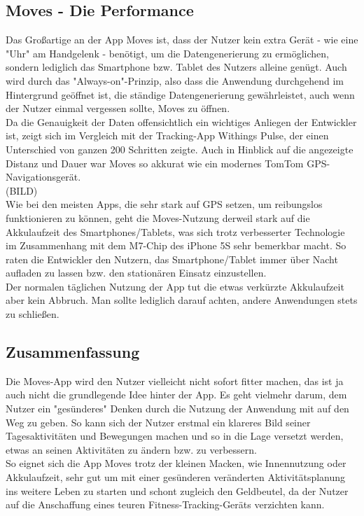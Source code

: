 \subsection{Moves - Die Performance}
\label{ch:Apps:sec:Moves:subsec:PERF}

Das Großartige an der App Moves ist, dass der Nutzer kein extra Gerät - wie eine "Uhr" am Handgelenk - benötigt, um die Datengenerierung zu ermöglichen, sondern lediglich das Smartphone bzw. Tablet des Nutzers alleine genügt. 
Auch wird durch das "Always-on"-Prinzip, also dass die Anwendung durchgehend im Hintergrund geöffnet ist, die ständige Datengenerierung gewährleistet, auch wenn der Nutzer einmal vergessen sollte, Moves zu öffnen.
\\
Da die Genauigkeit der Daten offensichtlich ein wichtiges Anliegen der Entwickler ist, zeigt sich im Vergleich mit der Tracking-App Withings Pulse, der einen Unterschied von ganzen 200 Schritten zeigte. 
Auch in Hinblick auf die angezeigte Distanz und Dauer war Moves so akkurat wie ein modernes TomTom GPS-Navigationsgerät.
\\
(BILD)
\\
Wie bei den meisten Apps, die sehr stark auf GPS setzen, um reibungslos funktionieren zu können, geht die Moves-Nutzung derweil stark auf die Akkulaufzeit des Smartphones/Tablets, was sich trotz verbesserter Technologie im Zusammenhang mit dem M7-Chip des iPhone 5S sehr bemerkbar macht. 
So raten die Entwickler den Nutzern, das Smartphone/Tablet immer über Nacht aufladen zu lassen bzw. den stationären Einsatz einzustellen.
\\
Der normalen täglichen Nutzung der App tut die etwas verkürzte Akkulaufzeit aber kein Abbruch. 
Man sollte lediglich darauf achten, andere Anwendungen stets zu schließen.

\subsection{Zusammenfassung}
\label{ch:Apps:sec:Moves:subsec:VERDICT} 

Die Moves-App wird den Nutzer vielleicht nicht sofort fitter machen, das ist ja auch nicht die grundlegende Idee hinter der App. 
Es geht vielmehr darum, dem Nutzer ein "gesünderes" Denken durch die Nutzung der Anwendung mit auf den Weg zu geben. 
So kann sich der Nutzer erstmal ein klareres Bild seiner Tagesaktivitäten und Bewegungen machen und so in die Lage versetzt werden, etwas an seinen Aktivitäten zu ändern bzw. zu verbessern.
\\
So eignet sich die App Moves trotz der kleinen Macken, wie Innennutzung oder Akkulaufzeit, sehr gut um mit einer gesünderen veränderten Aktivitätsplanung ins weitere Leben zu starten und schont zugleich den Geldbeutel, da der Nutzer auf die Anschaffung eines teuren Fitness-Tracking-Geräts verzichten kann.

